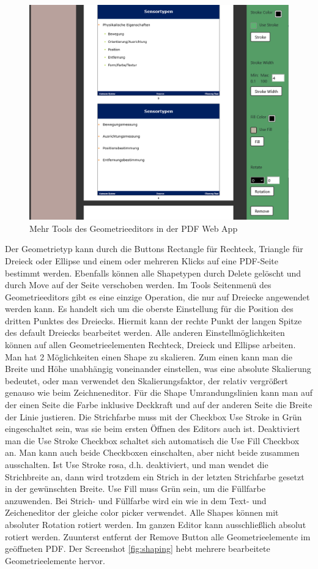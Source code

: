 \begin{figure}[!htbp]
	\centering
	\includegraphics[width=1\textwidth]{"images/shaper2.png"}
	\caption{Mehr Tools des Geometrieeditors in der PDF Web App}
	\label{fig:shaper2}
\end{figure}

Der Geometrietyp kann durch die Buttons Rectangle für Rechteck, Triangle für Dreieck oder Ellipse  und einem oder mehreren Klicks auf eine PDF-Seite bestimmt werden. Ebenfalls können alle Shapetypen durch Delete gelöscht und durch Move auf der Seite verschoben werden. Im Tools Seitenmenü des Geometrieeditors gibt es eine einzige Operation, die nur auf Dreiecke angewendet werden kann. Es handelt sich um die oberste Einstellung für die Position des dritten Punktes des Dreiecks. Hiermit kann der rechte Punkt der langen Spitze des default Dreiecks bearbeitet werden. Alle anderen Einstellmöglichkeiten können auf allen Geometrieelementen Rechteck, Dreieck und Ellipse arbeiten. Man hat 2 Möglichkeiten einen Shape zu skalieren. Zum einen kann man die Breite und Höhe unabhängig voneinander einstellen, was eine absolute Skalierung bedeutet, oder man verwendet den Skalierungsfaktor, der relativ vergrößert genauso wie beim Zeichneneditor. Für die Shape Umrandungslinien kann man auf der einen Seite die Farbe inklusive Deckkraft und auf der anderen Seite die Breite der Linie justieren. Die Strichfarbe muss mit der Checkbox Use Stroke in Grün eingeschaltet sein, was sie beim ersten Öffnen des Editors auch ist. Deaktiviert man die Use Stroke Checkbox schaltet sich automatisch die Use Fill Checkbox an. Man kann auch beide Checkboxen einschalten, aber nicht beide zusammen ausschalten. Ist Use Stroke rosa, d.h. deaktiviert, und man wendet die Strichbreite an, dann wird trotzdem ein Strich in der letzten Strichfarbe gesetzt in der gewünschten Breite. Use Fill muss Grün sein, um die Füllfarbe anzuwenden. Bei Strich- und Füllfarbe wird ein wie in dem Text- und Zeicheneditor der gleiche color picker verwendet. Alle Shapes können mit absoluter Rotation rotiert werden. Im ganzen Editor kann ausschließlich absolut rotiert werden. Zuunterst entfernt der Remove Button alle Geometrieelemente im geöffneten PDF. Der Screenshot \ref{fig:shaping} hebt mehrere bearbeitete Geometrieelemente hervor.

